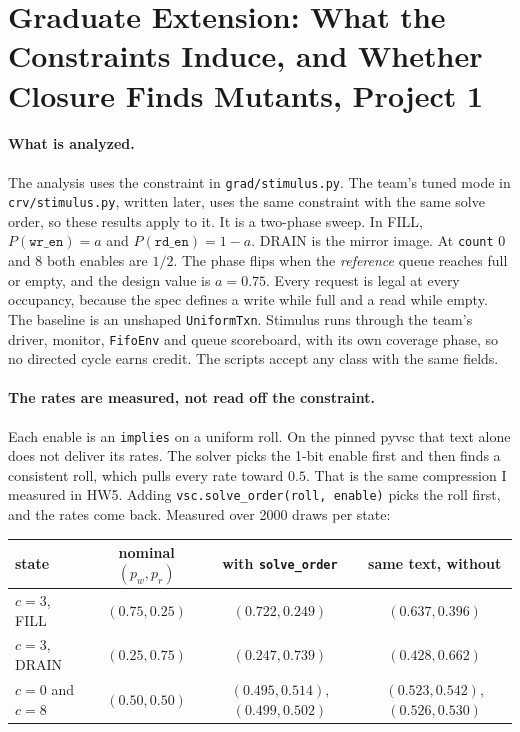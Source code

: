 \documentclass[11pt]{article}
\begin{document}
\thispagestyle{empty}

\section*{Graduate Extension: What the Constraints Induce, and Whether Closure Finds Mutants, Project 1}

\paragraph{What is analyzed.}
The analysis uses the constraint in \texttt{grad/stimulus.py}. The team's
tuned mode in \texttt{crv/stimulus.py}, written later, uses the same
constraint with the same solve order, so these results apply to it. It is a two-phase
sweep. In FILL, $P(\texttt{wr\_en}) = a$ and $P(\texttt{rd\_en}) = 1-a$. DRAIN
is the mirror image. At \texttt{count} $0$ and $8$ both enables are $1/2$. The
phase flips when the \emph{reference} queue reaches full or empty, and the
design value is $a = 0.75$. Every request is legal at every occupancy, because
the spec defines a write while full and a read while empty. The baseline is an
unshaped \texttt{UniformTxn}. Stimulus runs through the team's driver, monitor,
\texttt{FifoEnv} and queue scoreboard, with its own coverage phase, so no
directed cycle earns credit. The scripts accept any class with the same fields.

\paragraph{The rates are measured, not read off the constraint.}
Each enable is an \texttt{implies} on a uniform roll. On the pinned pyvsc that
text alone does not deliver its rates. The solver picks the 1-bit enable first
and then finds a consistent roll, which pulls every rate toward $0.5$. That is
the same compression I measured in HW5. Adding
\texttt{vsc.solve\_order(roll, enable)} picks the roll first, and the rates
come back. Measured over 2000 draws per state:

\begin{table}[h]
\centering
\begin{tabular}{@{}lccc@{}}
\toprule
\textbf{state} & nominal $(p_w, p_r)$ & with \texttt{solve\_order} & same text, without \\
\midrule
$c=3$, FILL  & $(0.75, 0.25)$ & $(0.722, 0.249)$ & $(0.637, 0.396)$ \\
$c=3$, DRAIN & $(0.25, 0.75)$ & $(0.247, 0.739)$ & $(0.428, 0.662)$ \\
$c=0$ and $c=8$ & $(0.50, 0.50)$ & $(0.495, 0.514)$, $(0.499, 0.502)$ & $(0.523, 0.542)$, $(0.526, 0.530)$ \\
\bottomrule
\end{tabular}
\end{table}
\end{document}

